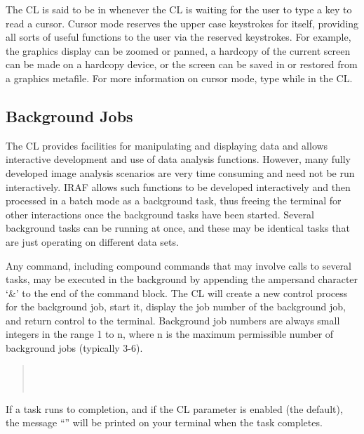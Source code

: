 The CL is said to be in  whenever the CL is waiting
for the user to type a key to read a cursor.  Cursor mode reserves the upper
case keystrokes for itself, providing all sorts of useful functions to the
user via the reserved keystrokes.  For example, the graphics display can be
zoomed or panned, a hardcopy of the current screen can be made on a hardcopy
device, or the screen can be saved in or restored from a graphics metafile.
For more information on cursor mode, type  while in
the CL.

\subsection{Background Jobs}

\ppind
The CL provides facilities for manipulating and displaying data and
allows interactive development and use of data analysis functions.  However,
many fully developed image analysis scenarios are very time consuming
and need not be run interactively.  IRAF allows such functions to
be developed interactively and then processed in a batch mode as
a background task, thus freeing the terminal for other interactions
once the background tasks have been started.  Several
background tasks can be running at once, and these may be identical
tasks that are just operating on different data sets.  

Any command, including compound commands that may involve calls to several
tasks, may be executed in the background by appending the ampersand character
`\&' to the end of the command block.  The CL will create a new control
process for the background job, start it, display the job number of the
background job, and return control to the terminal.  
Background job numbers are always small integers in the range 1 to n, 
where n is the maximum permissible number of background jobs (typically 3-6).

\begin{quotation}\noindent
{}  \\
\comptype{[1]} \\
\end{quotation}

\noindent
If a task runs to completion, and if the CL  parameter 
is enabled (the default), the message 
``'' will be printed on your
terminal when the task completes. 

